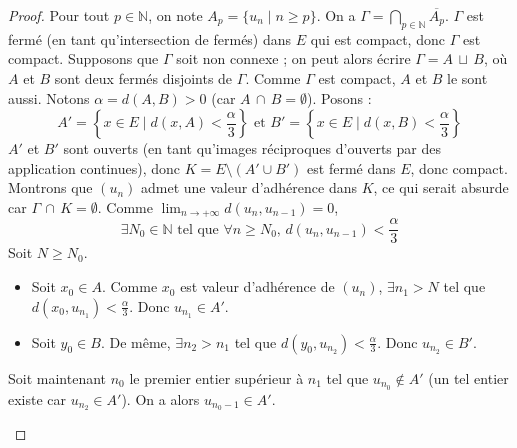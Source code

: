   \begin{proof}
    Pour tout $p \in \mathbb{N}$, on note $A_p = \{u_n \mid n\geq p\}$. On a $\Gamma = \bigcap_{p \in \mathbb{N}} \overline{A_p}$. $\Gamma$ est fermé (en tant qu'intersection de fermés) dans $E$ qui est compact, donc $\Gamma$ est compact.
    Supposons que $\Gamma$ soit non connexe ; on peut alors écrire $\Gamma = A \, \sqcup \, B$, où $A$ et $B$ sont deux fermés disjoints de $\Gamma$. Comme $\Gamma$ est compact, $A$ et $B$ le sont aussi. Notons $\alpha = d(A, B) > 0$ (car $A \, \cap \, B = \emptyset$). Posons :
    \[
    A'= \left \{ x \in E \mid d(x, A) < \frac{\alpha}{3} \right \} \text{ et } B'= \left \{ x \in E \mid d(x, B) < \frac{\alpha}{3} \right \}
    \]
    $A'$ et $B'$ sont ouverts (en tant qu'images réciproques d'ouverts par des application continues), donc $K = E \setminus (A'\cup B')$ est fermé dans $E$, donc compact.
    \newpar
    Montrons que $(u_n)$ admet une valeur d'adhérence dans $K$, ce qui serait absurde car $\Gamma \, \cap \, K = \emptyset$. Comme $\lim_{n \rightarrow +\infty} d(u_n, u_{n-1})=0$,
    \[ \exists N_0 \in \mathbb{N} \text{ tel que } \forall n \geq N_0, \, d(u_n, u_{n-1}) < \frac{\alpha}{3} \tag{$*$} \]
    Soit $N \geq N_0$.
    \begin{itemize}
      \item Soit $x_0 \in A$. Comme $x_0$ est valeur d'adhérence de $(u_n)$, $\exists n_1 > N$ tel que $d(x_0, u_{n_1}) < \frac{\alpha}{3}$. Donc $u_{n_1} \in A'$.
      \item Soit $y_0 \in B$. De même, $\exists n_2 > n_1$ tel que $d(y_0, u_{n_2}) < \frac{\alpha}{3}$. Donc $u_{n_2} \in B'$.
    \end{itemize}
    Soit maintenant $n_0$ le premier entier supérieur à $n_1$ tel que $u_{n_0} \notin A'$ (un tel entier existe car $u_{n_2} \in A'$). On a alors $u_{n_0 - 1} \in A'$.
    \begin{center}
\end{center}
\end{proof}
